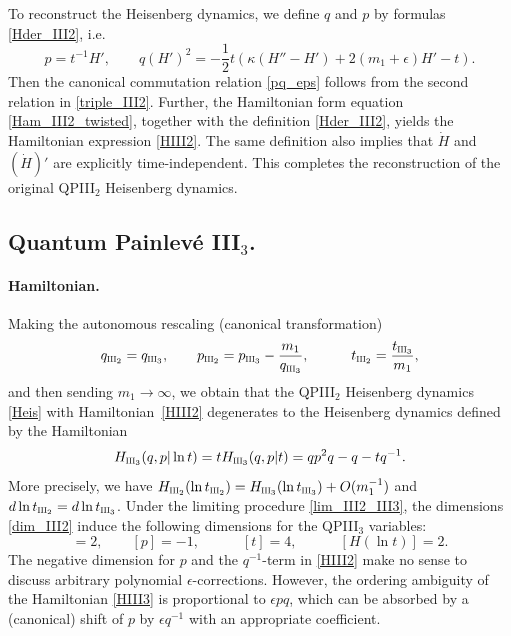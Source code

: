 \documentclass[12pt,a4paper]{article}
\numberwithin{equation}{section}
\newcommand{\III}{\scalebox{.6}{III}}
\begin{document}
To reconstruct the Heisenberg dynamics, we define $q$ and $p$ by formulas \eqref{Hder_III2}, i.e.
\begin{equation}\label{pq_dict_III2}
p=t^{-1}H', \qquad q(H')^2=-\frac12t\left(\kappa(H''{-}H')+2(m_1{+}\epsilon)H'-t\right).
\end{equation}
Then the canonical commutation relation \eqref{pq_eps} follows from the second relation in \eqref{triple_III2}. Further, the Hamiltonian form equation \eqref{Ham_III2_twisted}, together with the definition \eqref{Hder_III2}, yields the Hamiltonian expression \eqref{HIII2}. The same definition also implies that $\dot{H}$ and $(\dot{H})'$ are explicitly time-independent. This completes the reconstruction of the original QPIII$_2$ Heisenberg dynamics.
 
 \subsection{Quantum Painlev\'e III$_3$.}
 \paragraph{Hamiltonian.}
 Making the autonomous rescaling (canonical transformation)
\begin{equation}\label{lim_III2_III3}
 q_{\III_2}=q_{\III_3}, \qquad p_{\III_2}=p_{\III_3}-\frac{m_1}{q_{\III_3}}, \qquad  \quad t_{\III_2}=\frac{t_{\III_3}}{m_1},
 \end{equation}
and then sending $m_1\rightarrow\infty$, we obtain that the QPIII$_2$ Heisenberg dynamics \eqref{Heis} with Hamiltonian~\eqref{HIII2} degenerates to the Heisenberg dynamics defined by the Hamiltonian
\begin{equation}\label{HIII3}
 H_{\III_3}(q,p|\ln t)=t H_{\III_3}(q,p|t)=qp^2q-q-t q^{-1}.
\end{equation}
More precisely, we have
$H_{\III_2}(\ln t_{\III_2})=H_{\III_3}(\ln t_{\III_3})+O(m_1^{-1})$ and $d\ln t_{\III_2}=d\ln t_{\III_3}$.
Under the limiting procedure \eqref{lim_III2_III3}, the dimensions \eqref{dim_III2} induce the following dimensions for the QPIII$_3$ variables:
\begin{equation}
[q]=2, \qquad [p]=-1, \qquad \quad [t]=4,  \qquad \quad [H(\ln t)]=2.
\end{equation}
The negative dimension for $p$ and the $q^{-1}$-term in \eqref{HIII2} make no sense to discuss arbitrary polynomial $\epsilon$-corrections. However, the ordering ambiguity of the Hamiltonian \eqref{HIII3} is proportional to $\epsilon pq$, which can be absorbed by a (canonical) shift of $p$ by $\epsilon q^{-1}$ with an appropriate coefficient.
\end{document}

